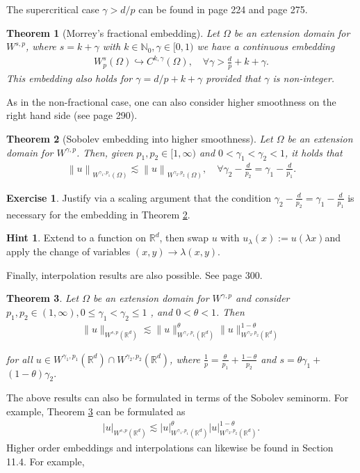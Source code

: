 \documentclass[
    a4paper,
    DIV=14,
    abstract=true,
    numbers=noenddot
]
{scrartcl}
\newtheorem{theorem}{Theorem}[section]
\theoremstyle{definition}
\newtheorem{exercise}{Exercise}
\newtheorem*{hint}{Hint}
\renewcommand{\norm}[1]{\left\lVert #1 \right\rVert}\renewcommand{\abs}[1]{\left| #1 \right|}
\newcommand{\N}{\mathbb{N}}
\newcommand{\R}{\mathbb{R}}
\begin{document}
The supercritical case $\gamma>d/p$ can be found in \cite{agranovich2015sobolev} page 224 and \cite{leoni2023first} page 275.
\begin{theorem}[Morrey's fractional embedding]\label{morrey embedding}
  Let $\Omega $ be an extension domain for $W^{s,p}$, where $s=k+ \gamma $ with $k \in \N_0, \gamma \in [0,1)$  we have a continuous embedding
  \begin{align*}
    W_p^s(\Omega) \hookrightarrow  C^{k,\gamma}(\Omega), \quad\forall \gamma> \frac{d}{p} + k+\gamma.
  \end{align*}
  This embedding also holds for $\gamma=d / p+k+\gamma$ provided that $\gamma $ is non-integer.
\end{theorem}
As in the non-fractional case, one can also consider higher smoothness on the right hand side (see \cite{leoni2023first} page 290).
\begin{theorem}[Sobolev embedding into higher smoothness]\label{higher smoothness embedding}
  Let $\Omega $ be an extension domain for $W^{\gamma,p}$. Then, given $p_1, p_2 \in [1,\infty)$ and $0<\gamma_1<\gamma_2< 1$, it holds that
  \begin{align*}
    \norm{u}_{W^{\gamma_1,p_1}(\Omega )}\lesssim \norm{u}_{W^{\gamma_2,p_2}(\Omega )}, \quad\forall \gamma_2 - \frac{d}{p_2} = \gamma_1 - \frac{d}{p_1}.
  \end{align*}
\end{theorem}
\begin{exercise}
  Justify via a scaling argument that the condition $\gamma_2 - \frac{d}{p_2} = \gamma_1 - \frac{d}{p_1}$ is necessary for the embedding in Theorem \ref{higher smoothness embedding}.
\end{exercise}
\begin{hint}
  Extend to a function on $\R^d$, then swap  $u$ with $u_\lambda (x):=u(\lambda x)$and apply the change of variables $(x,y)\to \lambda (x,y)$.
\end{hint}
Finally, interpolation results are also possible. See \cite{leoni2023first} page 300.
\begin{theorem}\label{interpolation embedding}
  Let $\Omega $ be an extension domain for $W^{\gamma,p}$ and consider $p_1,p_2 \in (1,\infty), 0 \leq \gamma_1<\gamma_2 \leq 1$ , and $0<\theta<1$. Then
  \begin{align*}
    \|u\|_{W^{s, p}(\R^d)} \lesssim\|u\|_{W^{\gamma_1, p_1}(\R^d)}^\theta\|u\|_{W^{\gamma_2, p_2}(\R^d)}^{1-\theta}
  \end{align*}

  for all $u \in W^{\gamma_1, p_1}(\R^d) \cap W^{\gamma_2, p_2}(\R^d)$, where $\frac{1}{p}=\frac{\theta}{p_1}+\frac{1-\theta}{p_2}$ and $s=\theta \gamma_1+$ $(1-\theta) \gamma_2.$
\end{theorem}
The above results can also be formulated in terms of the Sobolev seminorm. For example, Theorem \ref{interpolation embedding} can be formulated as
\begin{align*}
  \abs{u}_{W^{s, p}(\R^d)} \lesssim \abs{u}_{W^{\gamma_1, p_1}(\R^d)}^\theta\abs{u}_{W^{\gamma_2, p_2}(\R^d)}^{1-\theta}.
\end{align*}
Higher order embeddings and interpolations can likewise be found in \cite{leoni2023first} Section 11.4. For example,
\end{document}
